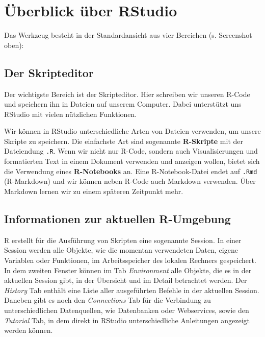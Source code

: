 \documentclass[
]{book}
\begin{document}
\hypertarget{uxfcberblick-uxfcber-rstudio}{%
\section{Überblick über RStudio}\label{uxfcberblick-uxfcber-rstudio}}

Das Werkzeug besteht in der Standardansicht aus vier Bereichen (s. Screenshot oben):

\hypertarget{der-skripteditor}{%
\subsection{Der Skripteditor}\label{der-skripteditor}}

Der wichtigste Bereich ist der Skripteditor. Hier schreiben wir unseren R-Code und speichern ihn in Dateien auf unserem Computer. Dabei unterstützt uns RStudio mit vielen nützlichen Funktionen.

Wir können in RStudio unterschiedliche Arten von Dateien verwenden, um unsere Skripte zu speichern. Die einfachste Art sind sogenannte \textbf{R-Skripte} mit der Dateiendung \texttt{.R}. Wenn wir nicht nur R-Code, sondern auch Visualisierungen und formatierten Text in einem Dokument verwenden und anzeigen wollen, bietet sich die Verwendung eines \textbf{R-Notebooks} an. Eine R-Notebook-Datei endet auf \texttt{.Rmd} (R-Markdown) und wir können neben R-Code auch Markdown verwenden. Über Markdown lernen wir zu einem späteren Zeitpunkt mehr.

\hypertarget{informationen-zur-aktuellen-r-umgebung}{%
\subsection{Informationen zur aktuellen R-Umgebung}\label{informationen-zur-aktuellen-r-umgebung}}

R erstellt für die Ausführung von Skripten eine sogenannte Session. In einer Session werden alle Objekte, wie die momentan verwendeten Daten, eigene Variablen oder Funktionen, im Arbeitsspeicher des lokalen Rechners gespeichert. In dem zweiten Fenster können im Tab \emph{Environment} alle Objekte, die es in der aktuellen Session gibt, in der Übersicht und im Detail betrachtet werden. Der \emph{History} Tab enthält eine Liste aller ausgeführten Befehle in der aktuellen Session. Daneben gibt es noch den \emph{Connections} Tab für die Verbindung zu unterschiedlichen Datenquellen, wie Datenbanken oder Webservices, sowie den \emph{Tutorial} Tab, in dem direkt in RStudio unterschiedliche Anleitungen angezeigt werden können.
\end{document}
